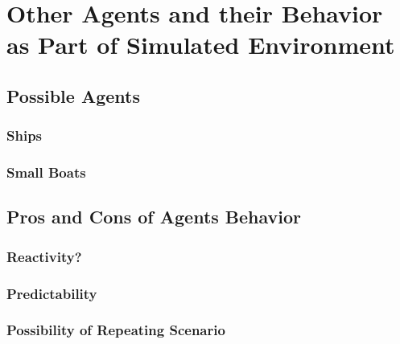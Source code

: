 \chapter{Other Agents and their Behavior as Part of Simulated Environment}

\section{Possible Agents}
\subsection{Ships}
\subsection{Small Boats}

\section{Pros and Cons of Agents Behavior}
\subsection{Reactivity?}
\subsection{Predictability}
\subsection{Possibility of Repeating Scenario}
